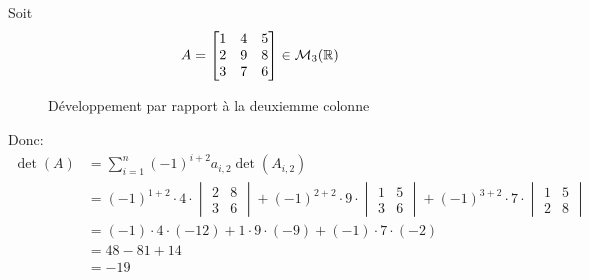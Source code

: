 \begin{eg}
   Soit  
   \[
   A = 
   \begin{bmatrix} 
       1 & 4 & 5\\
       2 & 9 & 8\\
       3 & 7 & 6
   \end{bmatrix} \in \mathcal{M}_3(\mathbb{R})
   \] 

\begin{figure}[H]
    \centering
    \caption{Développement par rapport à la deuxiemme colonne}
    \label{fig:mat-colonne-2}
\end{figure}
Donc:
\begin{align*}
    \det(A) &= \sum_{i=1}^{n} (-1)^{i + 2} a_{i, 2} \det(A_{i, 2}) \\
            &= (-1)^{1 + 2} \cdot 4 \cdot \begin{vmatrix} 2 & 8 \\ 3 & 6 \end{vmatrix} + (-1)^{2 + 2} \cdot 9 \cdot \begin{vmatrix} 1 & 5 \\ 3 & 6 \end{vmatrix}  + (-1)^{3 + 2} \cdot 7 \cdot \begin{vmatrix} 1 & 5 \\ 2 & 8 \end{vmatrix} \\
            &= (-1) \cdot 4 \cdot (-12) + 1 \cdot 9 \cdot (-9) + (-1) \cdot 7 \cdot (-2)\\
            &= 48 - 81 + 14\\
            &= -19
\end{align*}
\end{eg}
